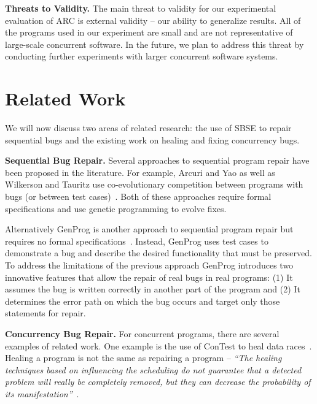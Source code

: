\documentclass[runningheads,a4paper]{llncs}
\begin{document}

\textbf{Threats to Validity.} The main threat to validity for our experimental evaluation of ARC is external validity -- our ability to generalize results. All of the programs used in our experiment are small and are not representative of large-scale concurrent software. In the future, we plan to address this threat by conducting further experiments with larger concurrent software systems.

\section{Related Work}
\label{sec:related_works}

We will now discuss two areas of related research: the use of SBSE to repair sequential bugs and the existing work on healing and fixing concurrency bugs.

\textbf{Sequential Bug Repair.} Several approaches to sequential program repair have been proposed in the literature. For example, Arcuri and Yao as well as Wilkerson and Tauritz use co-evolutionary competition between programs with bugs (or between test cases)~\cite{AY08, Arc08, WT10}.  Both of these approaches require formal specifications and use genetic programming to evolve fixes.  

Alternatively GenProg is another approach to sequential program repair but requires no formal specifications~\cite{WNLF09}. Instead, GenProg uses test cases to demonstrate a bug and describe the desired functionality that must be preserved. To address the limitations of the previous approach GenProg introduces two innovative features that allow the repair of real bugs in real programs: (1) It assumes the bug is written correctly in another part of the program and (2) It determines the error path on which the bug occurs and target only those statements  for repair. 


\textbf{Concurrency Bug Repair.} For concurrent programs, there are several examples of related work. One example is the use of ConTest to heal data races~\cite{KLT+07, LVK08}. Healing a program is not the same as repairing a program -- \textit{``The healing techniques based on influencing the scheduling do not guarantee that a detected problem will really be completely removed, but they can decrease the probability of its manifestation''}~\cite{LVK08}. %
\end{document}

